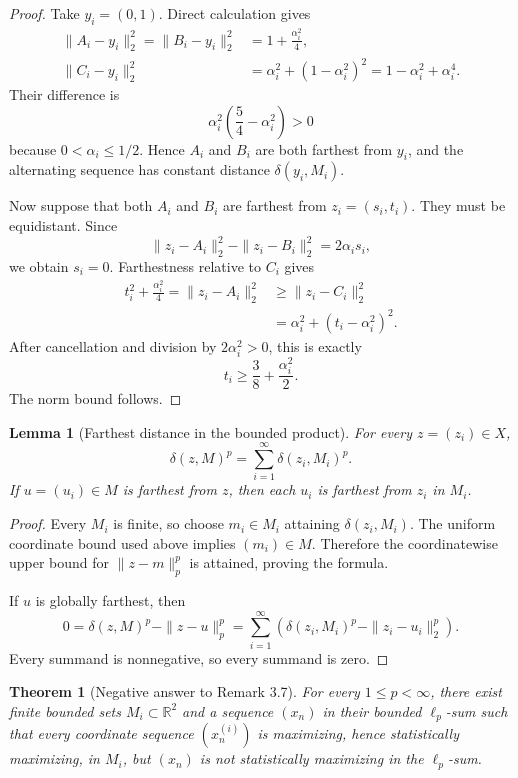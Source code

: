 \documentclass[11pt]{article}
\newtheorem{theorem}{Theorem}
\newtheorem{lemma}{Lemma}
\newcommand{\R}{\mathbb R}
\newcommand{\distmax}{\delta}
\begin{document}
\begin{proof}
Take $y_i=(0,1)$.  Direct calculation gives
\begin{align*}
 \|A_i-y_i\|_2^2=\|B_i-y_i\|_2^2
 &=1+\frac{\alpha_i^2}{4},\\
 \|C_i-y_i\|_2^2
 &=\alpha_i^2+(1-\alpha_i^2)^2
   =1-\alpha_i^2+\alpha_i^4.
\end{align*}
Their difference is
\[
 \alpha_i^2\left(\frac54-\alpha_i^2\right)>0
\]
because $0<\alpha_i\leq1/2$.  Hence $A_i$ and $B_i$ are both farthest from
$y_i$, and the alternating sequence has constant distance
$\distmax(y_i,M_i)$.

Now suppose that both $A_i$ and $B_i$ are farthest from
$z_i=(s_i,t_i)$.  They must be equidistant.  Since
\[
 \|z_i-A_i\|_2^2-\|z_i-B_i\|_2^2=2\alpha_i s_i,
\]
we obtain $s_i=0$.  Farthestness relative to $C_i$ gives
\begin{align*}
 t_i^2+\frac{\alpha_i^2}{4}
   =\|z_i-A_i\|_2^2
 &\geq \|z_i-C_i\|_2^2\\
 &=\alpha_i^2+(t_i-\alpha_i^2)^2.
\end{align*}
After cancellation and division by $2\alpha_i^2>0$, this is exactly
\[
 t_i\geq\frac38+\frac{\alpha_i^2}{2}.
\]
The norm bound follows.
\end{proof}

\begin{lemma}[Farthest distance in the bounded product]
\label{lem:product}
For every $z=(z_i)\in X$,
\[
 \distmax(z,M)^p
 =\sum_{i=1}^{\infty}\distmax(z_i,M_i)^p.
\]
If $u=(u_i)\in M$ is farthest from $z$, then each $u_i$ is farthest from
$z_i$ in $M_i$.
\end{lemma}

\begin{proof}
Every $M_i$ is finite, so choose $m_i\in M_i$ attaining
$\distmax(z_i,M_i)$.  The uniform coordinate bound used above implies
$(m_i)\in M$.  Therefore the coordinatewise upper bound for
$\|z-m\|_p^p$ is attained, proving the formula.

If $u$ is globally farthest, then
\[
 0=\distmax(z,M)^p-\|z-u\|_p^p
  =\sum_{i=1}^{\infty}
   \left(\distmax(z_i,M_i)^p-\|z_i-u_i\|_2^p\right).
\]
Every summand is nonnegative, so every summand is zero.
\end{proof}

\begin{theorem}[Negative answer to Remark 3.7]
\label{thm:counterexample}
For every $1\leq p<\infty$, there exist finite bounded sets
$M_i\subset\R^2$ and a sequence $(x_n)$ in their bounded $\ell_p$-sum such
that every coordinate sequence $(x_n^{(i)})$ is maximizing, hence
statistically maximizing, in $M_i$, but $(x_n)$ is not statistically
maximizing in the $\ell_p$-sum.
\end{theorem}
\end{document}
